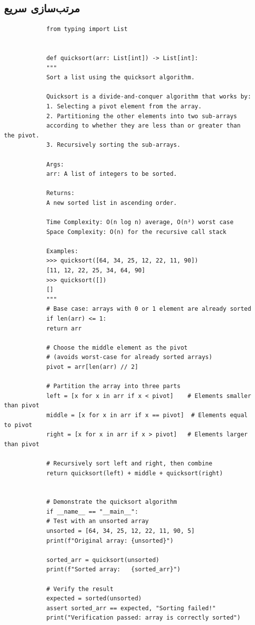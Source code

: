 \documentclass{matinbook}
\begin{document}
    \subsection{مرتب‌سازی سریع}
    
    \begin{latin}
        \begin{verbatim}
            from typing import List
            
            
            def quicksort(arr: List[int]) -> List[int]:
            """
            Sort a list using the quicksort algorithm.
            
            Quicksort is a divide-and-conquer algorithm that works by:
            1. Selecting a pivot element from the array.
            2. Partitioning the other elements into two sub-arrays
            according to whether they are less than or greater than the pivot.
            3. Recursively sorting the sub-arrays.
            
            Args:
            arr: A list of integers to be sorted.
            
            Returns:
            A new sorted list in ascending order.
            
            Time Complexity: O(n log n) average, O(n²) worst case
            Space Complexity: O(n) for the recursive call stack
            
            Examples:
            >>> quicksort([64, 34, 25, 12, 22, 11, 90])
            [11, 12, 22, 25, 34, 64, 90]
            >>> quicksort([])
            []
            """
            # Base case: arrays with 0 or 1 element are already sorted
            if len(arr) <= 1:
            return arr
            
            # Choose the middle element as the pivot
            # (avoids worst-case for already sorted arrays)
            pivot = arr[len(arr) // 2]
            
            # Partition the array into three parts
            left = [x for x in arr if x < pivot]    # Elements smaller than pivot
            middle = [x for x in arr if x == pivot]  # Elements equal to pivot
            right = [x for x in arr if x > pivot]   # Elements larger than pivot
            
            # Recursively sort left and right, then combine
            return quicksort(left) + middle + quicksort(right)
            
            
            # Demonstrate the quicksort algorithm
            if __name__ == "__main__":
            # Test with an unsorted array
            unsorted = [64, 34, 25, 12, 22, 11, 90, 5]
            print(f"Original array: {unsorted}")
            
            sorted_arr = quicksort(unsorted)
            print(f"Sorted array:   {sorted_arr}")
            
            # Verify the result
            expected = sorted(unsorted)
            assert sorted_arr == expected, "Sorting failed!"
            print("Verification passed: array is correctly sorted")
        \end{verbatim}
    \end{latin}
\end{document}
